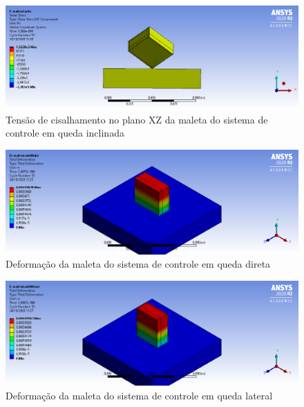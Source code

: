 \begin{apendicesenv}
\begin{figure}[htb]
    \centering
    \includegraphics[width=1.0\textwidth, angle=0]{figuras/estrutura_simulacaoImpacto/maletaCisalhamentoXZCanto.png}
    \caption{Tensão de cisalhamento no plano XZ da maleta do sistema de controle em queda inclinada}
    \label{fig:simulacaoImpacto_24}
\end{figure}

\begin{figure}[htb]
    \centering
    \includegraphics[width=1.0\textwidth, angle=0]{figuras/estrutura_simulacaoImpacto/maletaDeformacaoMaior.png}
    \caption{Deformação da maleta do sistema de controle em queda direta}
    \label{fig:simulacaoImpacto_25}
\end{figure}

\begin{figure}[htb]
    \centering
    \includegraphics[width=1.0\textwidth, angle=0]{figuras/estrutura_simulacaoImpacto/maletaDeformacaoMenor.png}
    \caption{Deformação da maleta do sistema de controle em queda lateral}
    \label{fig:simulacaoImpacto_26}
\end{figure}


\end{apendicesenv}
